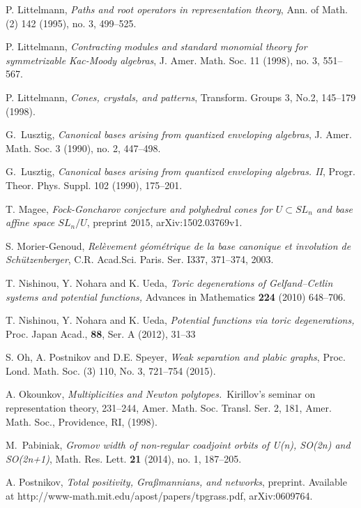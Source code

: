 \documentclass{emsprocart}
\theoremstyle{definition}
\begin{document}
\begin{thebibliography}{7}
P. Littelmann, \textit{Paths and root operators in representation theory}, Ann. of Math.
(2) 142 (1995), no. 3, 499--525.

P. Littelmann, \textit{Contracting modules and standard monomial theory for symmetrizable
Kac-Moody algebras}, J. Amer. Math. Soc. 11 (1998), no. 3, 551--567.

P. Littelmann, \textit{Cones, crystals, and patterns}, Transform. Groups 3, No.2,
145--179 (1998).

G.~Lusztig, {\it Canonical bases arising from quantized enveloping algebras}, J. Amer. Math.
Soc. 3 (1990), no. 2, 447--498.

G.~Lusztig, {\it Canonical bases arising from quantized enveloping algebras. II}, Progr. Theor.
Phys. Suppl. 102 (1990), 175--201.

T.  Magee, \textit{Fock-Goncharov conjecture and polyhedral cones for $U\subset SL_n$ and
base affine space $SL_n /U$}, preprint 2015, arXiv:1502.03769v1.

S. Morier-Genoud,
\textit{Rel\`evement g\'eom\'etrique de la base canonique et involution de Sch\"utzenberger}, 
C.R. Acad.Sci. Paris. Ser. I337, 371--374, 2003.

T. Nishinou, Y. Nohara and K. Ueda,
\textit{Toric degenerations of Gelfand--Cetlin systems and potential functions,}
Advances in Mathematics {\bf 224} (2010) 648--706.

T. Nishinou, Y. Nohara and K. Ueda,
\textit{Potential functions via toric degenerations,}
Proc. Japan Acad., {\bf 88}, Ser. A (2012), 31--33

S. Oh, A. Postnikov and D.E. Speyer, 
\textit{Weak separation and plabic graphs}, 
Proc. Lond. Math. Soc. (3) 110, No. 3, 721--754 (2015).

A. Okounkov, {\it Multiplicities and Newton polytopes.}\, Kirillov's seminar on representation theory, 231--244,
Amer. Math. Soc. Transl. Ser. 2, 181, Amer. Math. Soc., Providence, RI, (1998).

 M.~Pabiniak, \emph{Gromov width of non-regular
coadjoint orbits of U(n), SO(2n) and SO(2n+1)},  Math. Res. Lett. {\bf 21} (2014), no. 1, 187--205.

A. Postnikov, \textit{Total positivity, Gra\ss mannians, and networks}, preprint. Available at
http://www-math.mit.edu/apost/papers/tpgrass.pdf, arXiv:0609764.


\end{thebibliography}
\end{document}
